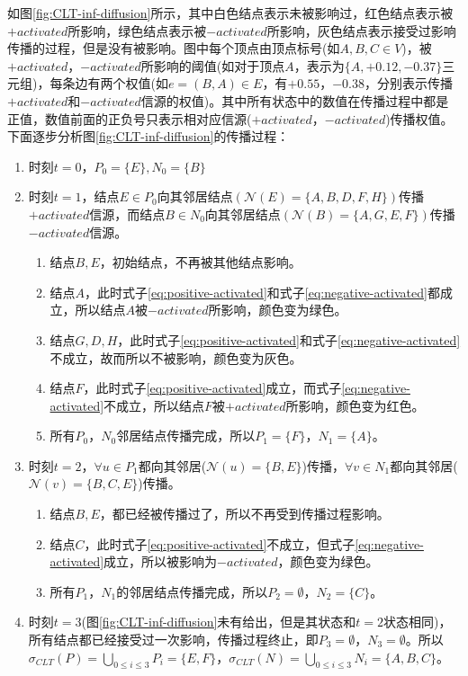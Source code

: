 如图\ref{fig:CLT-inf-diffusion}所示，其中白色结点表示未被影响过，红色结点表示被$+activated$所影响，绿色结点表示被$-activated$所影响，灰色结点表示接受过影响传播的过程，但是没有被影响。图中每个顶点由顶点标号(如$A, B, C \in V$)，被$+activated$，$-activated$所影响的阈值(如对于顶点$A$，表示为$\{A, +0.12, -0.37\}$三元组)，每条边有两个权值(如$e = (B, A) \in E$，有$+0.55$，$-0.38$，分别表示传播$+activated$和$-activated$信源的权值)。其中所有状态中的数值在传播过程中都是正值，数值前面的正负号只表示相对应信源($+activated$，$-activated$)传播权值。下面逐步分析图\ref{fig:CLT-inf-diffusion}的传播过程：
\begin{enumerate}
\item 时刻$t=0$，$P_{0}=\{E\}, N_{0}=\{B\}$
\item 时刻$t=1$，结点$E \in P_{0}$向其邻居结点$(\mathcal{N}(E)=\{A, B, D, F, H\})$传播$+activated$信源，而结点$B \in N_{0}$向其邻居结点$(\mathcal{N}(B)=\{A, G, E, F\})$传播$-activated$信源。
	\begin{enumerate}
	\item 结点$B, E$，初始结点，不再被其他结点影响。
	\item 结点$A$，此时式子\ref{eq:positive-activated}和式子\ref{eq:negative-activated}都成立，所以结点$A$被$-activated$所影响，颜色变为绿色。
	\item 结点$G, D, H$，此时式子\ref{eq:positive-activated}和式子\ref{eq:negative-activated}不成立，故而所以不被影响，颜色变为灰色。
	\item 结点$F$，此时式子\ref{eq:positive-activated}成立，而式子\ref{eq:negative-activated}不成立，所以结点$F$被$+activated$所影响，颜色变为红色。
	\item 所有$P_{0}$，$N_{0}$邻居结点传播完成，所以$P_{1}=\{ F\}$，$N_{1}=\{A\}$。
	\end{enumerate}
\item 时刻$t=2$，$\forall u \in P_{1}$都向其邻居($\mathcal{N}(u)=\{B, E\}$)传播，$\forall v \in N_{1}$都向其邻居($\mathcal{N}(v)=\{B, C, E\}$)传播。
	\begin{enumerate}
	\item 结点$B, E$，都已经被传播过了，所以不再受到传播过程影响。
	\item 结点$C$，此时式子\ref{eq:positive-activated}不成立，但式子\ref{eq:negative-activated}成立，所以被影响为$-activated$，颜色变为绿色。
	\item 所有$P_{1}$，$N_{1}$的邻居结点传播完成，所以$P_{2}=\emptyset$，$N_{2}=\{C\}$。
	\end{enumerate}
\item 时刻$t=3$(图\ref{fig:CLT-inf-diffusion}未有给出，但是其状态和$t=2$状态相同)，所有结点都已经接受过一次影响，传播过程终止，即$P_{3}=\emptyset$，$N_{3}=\emptyset$。所以$\sigma_{CLT}(P)=\bigcup_{0 \leq i \leq 3}P_{i}=\{E, F\}$，$\sigma_{CLT}(N)=\bigcup_{0 \leq i \leq 3}N_{i}=\{A, B, C\}$。
\end{enumerate}



